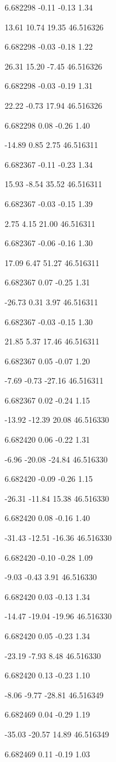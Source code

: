 6.682298
-0.11
-0.13
1.34

13.61
10.74
19.35
46.516326

6.682298
-0.03
-0.18
1.22

26.31
15.20
-7.45
46.516326

6.682298
-0.03
-0.19
1.31

22.22
-0.73
17.94
46.516326

6.682298
0.08
-0.26
1.40

-14.89
0.85
2.75
46.516311

6.682367
-0.11
-0.23
1.34

15.93
-8.54
35.52
46.516311

6.682367
-0.03
-0.15
1.39

2.75
4.15
21.00
46.516311

6.682367
-0.06
-0.16
1.30

17.09
6.47
51.27
46.516311

6.682367
0.07
-0.25
1.31

-26.73
0.31
3.97
46.516311

6.682367
-0.03
-0.15
1.30

21.85
5.37
17.46
46.516311

6.682367
0.05
-0.07
1.20

-7.69
-0.73
-27.16
46.516311

6.682367
0.02
-0.24
1.15

-13.92
-12.39
20.08
46.516330

6.682420
0.06
-0.22
1.31

-6.96
-20.08
-24.84
46.516330

6.682420
-0.09
-0.26
1.15

-26.31
-11.84
15.38
46.516330

6.682420
0.08
-0.16
1.40

-31.43
-12.51
-16.36
46.516330

6.682420
-0.10
-0.28
1.09

-9.03
-0.43
3.91
46.516330

6.682420
0.03
-0.13
1.34

-14.47
-19.04
-19.96
46.516330

6.682420
0.05
-0.23
1.34

-23.19
-7.93
8.48
46.516330

6.682420
0.13
-0.23
1.10

-8.06
-9.77
-28.81
46.516349

6.682469
0.04
-0.29
1.19

-35.03
-20.57
14.89
46.516349

6.682469
0.11
-0.19
1.03

